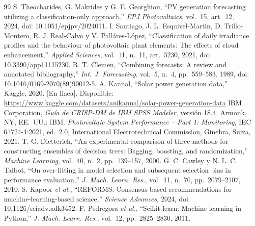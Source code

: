\documentclass[conference]{IEEEtran}
\begin{document}
\begin{thebibliography}{99}
 S. Theocharides, G. Makrides y G. E. Georghiou, ``PV generation forecasting utilizing a classification-only approach,'' \emph{EPJ Photovoltaics}, vol.~15, art.~12, 2024, doi: 10.1051/epjpv/2024011.
 I. Santiago, J. L. Esquivel-Martin, D. Trillo-Montero, R. J. Real-Calvo y V. Pall\'ares-L\'opez, ``Classification of daily irradiance profiles and the behaviour of photovoltaic plant elements: The effects of cloud enhancement,'' \emph{Applied Sciences}, vol.~11, n.\textordmasculine~11, art.~5230, 2021, doi: 10.3390/app11115230.
 R. T. Clemen, ``Combining forecasts: A review and annotated bibliography,'' \emph{Int. J. Forecasting}, vol.~5, n.\textordmasculine~4, pp.~559--583, 1989, doi: 10.1016/0169-2070(89)90012-5.
 A. Kannal, ``Solar power generation data,'' Kaggle, 2020. [En l\'inea]. Disponible: \url{https://www.kaggle.com/datasets/anikannal/solar-power-generation-data}
 IBM Corporation, \emph{Gu\'ia de CRISP-DM de IBM SPSS Modeler}, versi\'on 18.4. Armonk, NY, EE.~UU.: IBM.
 \emph{Photovoltaic System Performance -- Part 1: Monitoring}, IEC 61724-1:2021, ed.~2.0, International Electrotechnical Commission, Ginebra, Suiza, 2021.
 T. G. Dietterich, ``An experimental comparison of three methods for constructing ensembles of decision trees: Bagging, boosting, and randomization,'' \emph{Machine Learning}, vol.~40, n.\textordmasculine~2, pp.~139--157, 2000.
 G. C. Cawley y N. L. C. Talbot, ``On over-fitting in model selection and subsequent selection bias in performance evaluation,'' \emph{J. Mach. Learn. Res.}, vol.~11, n.\textordmasculine~70, pp.~2079--2107, 2010.
 S. Kapoor \emph{et al.}, ``REFORMS: Consensus-based recommendations for machine-learning-based science,'' \emph{Science Advances}, 2024, doi: 10.1126/sciadv.adk3452.
 F. Pedregosa \emph{et al.}, ``Scikit-learn: Machine learning in Python,'' \emph{J. Mach. Learn. Res.}, vol.~12, pp.~2825--2830, 2011.
\end{thebibliography}
\end{document}
